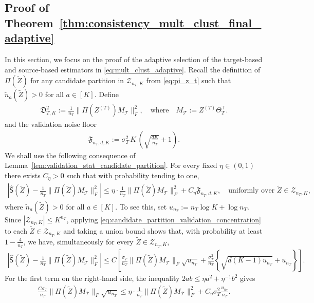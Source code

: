 \documentclass[10pt]{article}
\newcommand{\wh}{\widehat}
\newcommand{\wt}{\widetilde}
\newcommand{\calT}{\mathcal T}
\newcommand{\trg}{T}
\newcommand{\nT}{n_{\trg}}
\newcommand{\sigmaT}{\sigma_{\trg}}
\newcommand{\Ztar}{Z^{(\trg)}}
\newcommand{\ThetaT}{\Theta_{\trg}}
\begin{document}
\subsection{Proof of Theorem~\ref{thm:consistency_mult_clust_final_adaptive}}
In this section, we focus on the proof of the adaptive selection of the target-based and source-based estimators in \eqref{eq:mult_clust_adaptive}. Recall the definition of $\Pi(\wt Z)$ for any candidate partition in $\mathcal Z_{\nT,K}$ from \eqref{eq:pi_z_t} such that $\wt n_a(\wt Z)>0$ for all $a \in [K]$. Define
\begin{align}
\label{eq:target_oracle_energy_mult_re_write}
    \mathfrak D_{\trg,K}^2:=\frac{1}{\nT}\|\Pi(\Ztar)M_\calT\|_F^2,
    \quad \mbox{where} \quad M_\calT:=\Ztar\ThetaT^\top.
\end{align}
and the validation noise floor
\begin{align}
\label{eq:validation_noise_floor_mult}
    \mathfrak F_{\nT,d,K}:=\sigmaT^2\, K\,\left(\sqrt{\frac{dK}{\nT}}+1\right).
\end{align}
We shall use the following consequence of
Lemma~\ref{lem:validation_stat_candidate_partition}. For every fixed $\eta\in(0,1)$ there exists $C_\eta>0$ such that with probability tending to one,
\begin{align}
\label{eq:uniform_validation_bound_mult}
\left|\wh{\mathsf S}(\wt Z)-\frac{1}{\nT}\|\Pi(\wt Z)M_\calT\|_F^2\right|
\le\eta\cdot\frac{1}{\nT}\|\Pi(\wt Z)M_\calT\|_F^2
+C_\eta\mathfrak F_{\nT,d,K},\quad\mbox{uniformly over $\wt Z\in\mathcal Z_{\nT,K}$,}
\end{align}
where $\wt n_a(\wt Z)>0$ for all $a \in [K]$.
To see this, set $u_{\nT}:=\nT\log K+\log\nT.$
Since $|\mathcal Z_{\nT,K}|\le K^{\nT}$, applying
\eqref{eq:candidate_partition_validation_concentration} to each
$\wt Z\in\mathcal Z_{\nT,K}$ and taking a union bound shows that, with probability at least $1-\frac{4}{\nT}$, we have, simultaneously for every $\wt Z\in\mathcal Z_{\nT,K}$,
\begin{align}
\label{eq:uniform_validation_bound_mult_intermediate}
\left|\wh{\mathsf S}(\wt Z)-\frac{1}{\nT}\|\Pi(\wt Z)M_\calT\|_F^2\right|
\le C\left[\frac{\sigmaT}{\nT}\|\Pi(\wt Z)M_\calT\|_F\sqrt{u_{\nT}}+\frac{\sigmaT^2}{\nT}\left\{\sqrt{d(K-1)u_{\nT}}+u_{\nT}\right\}\right].
\end{align}
For the first term on the right-hand side, the inequality $2ab\le\eta a^2+\eta^{-1}b^2$ gives
\begin{align}
\frac{C\sigmaT}{\nT}\|\Pi(\wt Z)M_\calT\|_F\sqrt{u_{\nT}}\le\eta\cdot\frac{1}{\nT}\|\Pi(\wt Z)M_\calT\|_F^2+C_\eta\sigmaT^2\frac{u_{\nT}}{\nT}.
\end{align}
\end{document}

